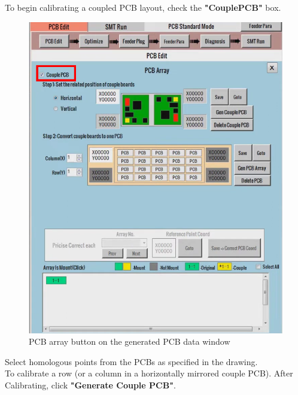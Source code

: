 \documentclass[a4paper,10pt]{report}
\begin{document}
To begin calibrating a coupled PCB layout, check the \textbf{"CouplePCB"} box.\\
\begin{figure}[!htb]
 \centering
 \includegraphics[width=1\textwidth]{images/scrot8.png}
 \caption{PCB array button on the generated PCB data window}
\end{figure}
\newpage
Select homologous points from the PCBs as specified in the drawing.\\
To calibrate a row (or a column in a horizontally mirrored couple PCB).
After Calibrating, click \textbf{"Generate Couple PCB"}.
\end{document}
